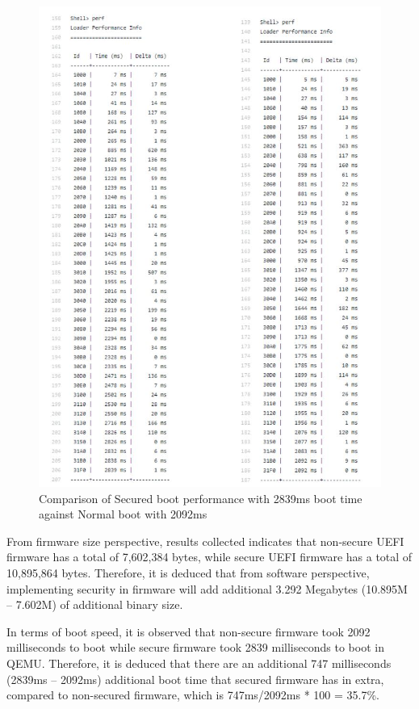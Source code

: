 \documentclass[]{rsos}%
\begin{document}
\begin{figure}[hbt!]
	\centering
	\includegraphics[width=1\textwidth]{figs/SecureBootVsNormalBootPerformance.JPG}
	\caption{Comparison of Secured boot performance with 2839ms boot time against Normal boot with 2092ms}
\end{figure}

From firmware size perspective, results collected indicates that non-secure UEFI firmware has a total of 7,602,384 bytes, while secure UEFI firmware has a total of 10,895,864 bytes. Therefore, it is deduced that from software perspective, implementing security in firmware will add additional 3.292 Megabytes (10.895M – 7.602M) of additional binary size.

In terms of boot speed, it is observed that non-secure firmware took 2092 milliseconds to boot while secure firmware took 2839 milliseconds to boot in QEMU. Therefore, it is deduced that there are an additional 747 milliseconds (2839ms – 2092ms) additional boot time that secured firmware has in extra, compared to non-secured firmware, which is 747ms/2092ms * 100 = 35.7\%.
\end{document}
